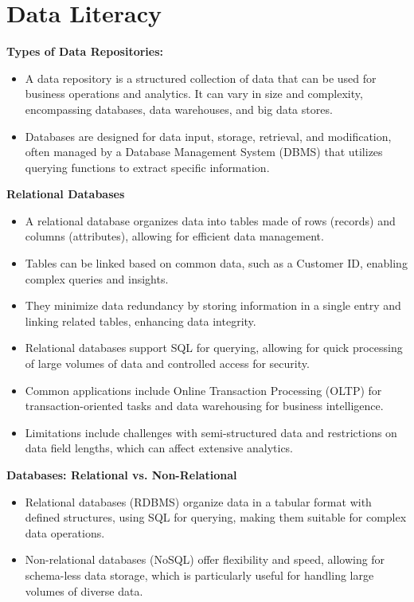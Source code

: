 \documentclass[12pt]{report} %
\begin{document}
	
		
\section{Data Literacy}

	\noindent \textbf{Types of Data Repositories:}
	\begin{itemize}
		\item A data repository is a structured collection of data that can be used for business operations and analytics. It can vary in size and complexity, encompassing databases, data warehouses, and big data stores.
		\item Databases are designed for data input, storage, retrieval, and modification, often managed by a Database Management System (DBMS) that utilizes querying functions to extract specific information.
	\end{itemize}

	\noindent \textbf{Relational Databases}
	\begin{itemize}
		\item A relational database organizes data into tables made of rows (records) and columns (attributes), allowing for efficient data management.
		\item Tables can be linked based on common data, such as a Customer ID, enabling complex queries and insights.
		\item They minimize data redundancy by storing information in a single entry and linking related tables, enhancing data integrity.
		\item Relational databases support SQL for querying, allowing for quick processing of large volumes of data and controlled access for security.
		\item Common applications include Online Transaction Processing (OLTP) for transaction-oriented tasks and data warehousing for business intelligence.
		\item Limitations include challenges with semi-structured data and restrictions on data field lengths, which can affect extensive analytics.
	\end{itemize}

	\noindent \textbf{Databases: Relational vs. Non-Relational}
	\begin{itemize}
		\item Relational databases (RDBMS) organize data in a tabular format with defined structures, using SQL for querying, making them suitable for complex data operations.
		\item Non-relational databases (NoSQL) offer flexibility and speed, allowing for schema-less data storage, which is particularly useful for handling large volumes of diverse data.
	\end{itemize}
\end{document}
